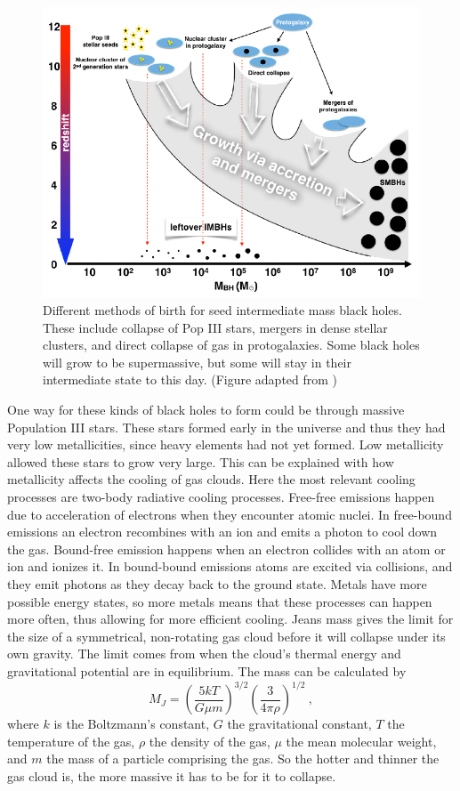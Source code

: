 \documentclass[english, oneside]{HYgradu}
\begin{document}
\begin{figure}
\centering
\includegraphics[width=\textwidth]{../images/imbhs.pdf}
\caption{Different methods of birth for seed intermediate mass black holes. These include collapse of Pop III stars, mergers in dense stellar clusters, and direct collapse of gas in protogalaxies. Some black holes will grow to be supermassive, but some will stay in their intermediate state to this day.
(Figure adapted from \citealt{mezcua:2017})}
\label{fig:imbhs}
\end{figure}

One way for these kinds of black holes to form could be through massive Population III stars. These stars formed early in the universe and thus they had very low metallicities, since heavy elements had not yet formed. Low metallicity allowed these stars to grow very large. This can be explained with how metallicity affects the cooling of gas clouds. 
Here the most relevant cooling processes are two-body radiative cooling processes. Free-free emissions happen due to acceleration of electrons when they encounter atomic nuclei. In free-bound emissions an electron recombines with an ion and emits a photon to cool down the gas. Bound-free emission happens when an electron collides with an atom or ion and ionizes it. In bound-bound emissions atoms are excited via collisions, and they emit photons as they decay back to the ground state. Metals have more possible energy states, so more metals means that these processes can happen more often, thus allowing for more efficient cooling.
Jeans mass gives the limit for the size of a symmetrical, non-rotating gas cloud before it will collapse under its own gravity. The limit comes from when the cloud's thermal energy and gravitational potential are in equilibrium. The mass can be calculated by
\begin{equation}
M_J = \left( \frac{5 k T}{G \mu m} \right)^{3/2} \left( \frac{3}{4 \pi \rho} \right)^{1/2} \ ,
\end{equation}
where $k$ is the Boltzmann's constant, $G$ the gravitational constant, $T$ the temperature of the gas, $\rho$ the density of the gas, $\mu$ the mean molecular weight, and $m$ the mass of a particle comprising the gas. So the hotter and thinner the gas cloud is, the more massive it has to be for it to collapse. 
\end{document}
